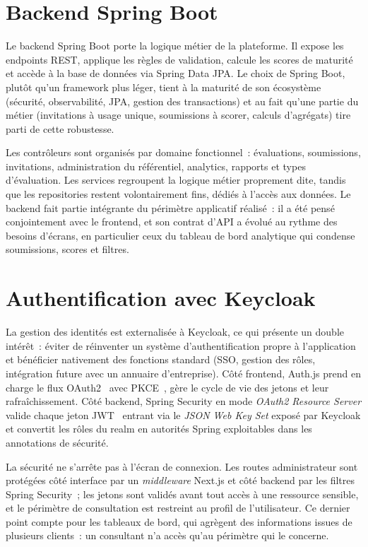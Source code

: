 \documentclass[12pt,a4paper]{report}
\begin{document}
\section{Backend Spring Boot}
Le backend Spring Boot porte la logique métier de la plateforme. Il expose les endpoints REST, applique les règles de validation, calcule les scores de maturité et accède à la base de données via Spring Data JPA. Le choix de Spring Boot, plutôt qu'un framework plus léger, tient à la maturité de son écosystème (sécurité, observabilité, JPA, gestion des transactions) et au fait qu'une partie du métier (invitations à usage unique, soumissions à scorer, calculs d'agrégats) tire parti de cette robustesse.

Les contrôleurs sont organisés par domaine fonctionnel~: évaluations, soumissions, invitations, administration du référentiel, analytics, rapports et types d'évaluation. Les services regroupent la logique métier proprement dite, tandis que les repositories restent volontairement fins, dédiés à l'accès aux données. Le backend fait partie intégrante du périmètre applicatif réalisé~: il a été pensé conjointement avec le frontend, et son contrat d'API a évolué au rythme des besoins d'écrans, en particulier ceux du tableau de bord analytique qui condense soumissions, scores et filtres.

\section{Authentification avec Keycloak}
La gestion des identités est externalisée à Keycloak, ce qui présente un double intérêt~: éviter de réinventer un système d'authentification propre à l'application et bénéficier nativement des fonctions standard (SSO, gestion des rôles, intégration future avec un annuaire d'entreprise). Côté frontend, Auth.js prend en charge le flux OAuth2~\cite{rfc6749} avec PKCE~\cite{rfc7636}, gère le cycle de vie des jetons et leur rafraîchissement. Côté backend, Spring Security en mode \textit{OAuth2 Resource Server} valide chaque jeton JWT~\cite{rfc7519} entrant via le \textit{JSON Web Key Set} exposé par Keycloak et convertit les rôles du realm en autorités Spring exploitables dans les annotations de sécurité.

La sécurité ne s'arrête pas à l'écran de connexion. Les routes administrateur sont protégées côté interface par un \textit{middleware} Next.js et côté backend par les filtres Spring Security~; les jetons sont validés avant tout accès à une ressource sensible, et le périmètre de consultation est restreint au profil de l'utilisateur. Ce dernier point compte pour les tableaux de bord, qui agrègent des informations issues de plusieurs clients~: un consultant n'a accès qu'au périmètre qui le concerne.
\end{document}
